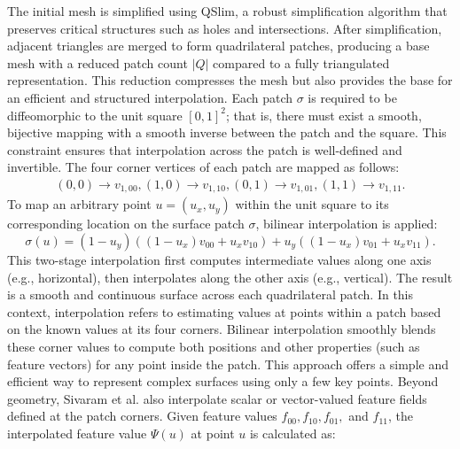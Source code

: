 The initial mesh is simplified using QSlim, a robust simplification algorithm that preserves critical structures such as holes and intersections. 
After simplification, adjacent triangles are merged to form quadrilateral patches, producing a base mesh with a reduced patch count \( |Q| \) compared to a fully triangulated representation. 
This reduction compresses the mesh but also provides the base for an efficient and structured interpolation. 
Each patch \( \sigma \) is required to be diffeomorphic to the unit square \( [0,1]^2 \); that is, there must exist a smooth, bijective mapping with a smooth inverse between the patch and the square. 
This constraint ensures that interpolation across the patch is well-defined and invertible. 
The four corner vertices of each patch are mapped as follows: 
\[\begin{array}{c}
(0,0) \to v_{1,00}, 
(1,0) \to v_{1,10}, 
(0,1) \to v_{1,01}, 
(1,1) \to v_{1,11}.
\end{array}\]
To map an arbitrary point \( u = (u_x, u_y) \) within the unit square to its corresponding location on the surface patch \( \sigma \), bilinear interpolation is applied: 
\[\sigma(u) = (1 - u_y)((1 - u_x)v_{00} + u_x v_{10}) + u_y((1 - u_x)v_{01} + u_x v_{11}).\]
This two-stage interpolation first computes intermediate values along one axis (e.g., horizontal), then interpolates along the other axis (e.g., vertical). 
The result is a smooth and continuous surface across each quadrilateral patch. 
In this context, interpolation refers to estimating values at points within a patch based on the known values at its four corners. 
Bilinear interpolation smoothly blends these corner values to compute both positions and other properties (such as feature vectors) for any point inside the patch. 
This approach offers a simple and efficient way to represent complex surfaces using only a few key points. 
Beyond geometry, Sivaram et al. also interpolate scalar or vector-valued feature fields defined at the patch corners. 
Given feature values \( f_{00}, f_{10}, f_{01}, \) and \( f_{11} \), the interpolated feature value \( \Psi(u) \) at point \( u \) is calculated as: 

